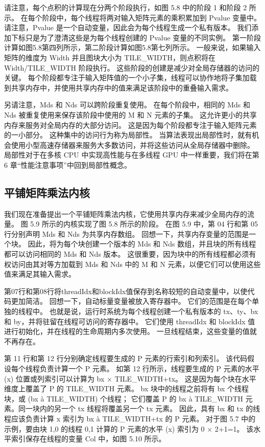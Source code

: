 请注意，每个点积的计算现在分两个阶段执行，如图 5.8 中的阶段 1 和阶段 2 所示。 在每个阶段中，每个线程将两对输入矩阵元素的乘积累加到 Pvalue 变量中。 请注意，Pvalue 是一个自动变量，因此会为每个线程生成一个私有版本。 我们添加下标只是为了澄清这些是为每个线程创建的 Pvalue 变量的不同实例。 第一阶段计算如图5.8第四列所示，第二阶段计算如图5.8第七列所示。 一般来说，如果输入矩阵的维度为 Width 并且图块大小为 TILE\_WIDTH，则点积将在 Width/TILE\_WIDTH 阶段执行。 这些阶段的创建是减少对全局存储器的访问的关键。 每个阶段都专注于输入矩阵值的一个小子集，线程可以协作地将子集加载到共享内存中，并使用共享内存中的值来满足该阶段中的重叠输入需求。

另请注意，Mds 和 Nds 可以跨阶段重复使用。 在每个阶段中，相同的 Mds 和 Nds 被重复使用来保存该阶段中使用的 M 和 N 元素的子集。 这允许更小的共享内存来服务对全局内存的大部分访问。 这是因为每个阶段都专注于输入矩阵元素的一小部分。 这种集中的访问行为称为局部性。 当算法表现出局部性时，就有机会使用小型高速存储器来服务大多数访问，并将这些访问从全局存储器中删除。 局部性对于在多核 CPU 中实现高性能与在多线程 GPU 中一样重要，我们将在第 6 章“性能注意事项”中回到局部性概念。

\subsection{平铺矩阵乘法内核}
我们现在准备提出一个平铺矩阵乘法内核，它使用共享内存来减少全局内存的流量。 图 5.9 所示的内核实现了图 5.8 所示的阶段。 在图 5.9 中，第 04 行和第 05 行分别声明 Mds 和 Nds 为共享内存数组。 回想一下，共享内存变量的范围是一个块。 因此，将为每个块创建一个版本的 Mds 和 Nds 数组，并且块的所有线程都可以访问相同的 Mds 和 Nds 版本。 这很重要，因为块中的所有线程都必须有权访问由其对等方加载到 Mds 和 Nds 中的 M 和 N 元素，以便它们可以使用这些值来满足其输入需求。

第07行和第08行将threadIdx和blockIdx值保存到名称较短的自动变量中，以使代码更加简洁。 回想一下，自动标量变量被放入寄存器中。 它们的范围是在每个单独的线程中。 也就是说，运行时系统为每个线程创建一个私有版本的 tx、ty、bx 和 by，并将驻留在线程可访问的寄存器中。 它们使用 threadIdx 和 blockIdx 值进行初始化，并在线程的生命周期内多次使用。 一旦线程结束，这些变量的值就不再存在。

第 11 行和第 12 行分别确定线程要生成的 P 元素的行索引和列索引。 该代码假设每个线程负责计算一个 P 元素。 如第 12 行所示，线程要生成的 P 元素的水平 (x) 位置或列索引可以计算为 bx × TILE\_WIDTH+tx。 这是因为每个块在水平维度上覆盖了 P 的 TILE\_WIDTH 元素。 bx 块中的线程之前将有 bx 个线程块，或 (bx à TILE\_WIDTH) 个线程； 它们覆盖 P 的 bx à TILE\_WIDTH 元素。同一块内的另一个 tx 线程将覆盖另一个 tx 元素。 因此，具有 bx 和 tx 的线程应该负责计算 x 索引为 bx à TILE\_WIDTH+tx 的 P 元素。 对于图 5.7 中的示例，要由块 1,0 的线程 0,1 计算的 P 元素的水平 (x) 索引为 0 × 2+1=1。 该水平索引保存在线程的变量 Col 中，如图 5.10 所示。

